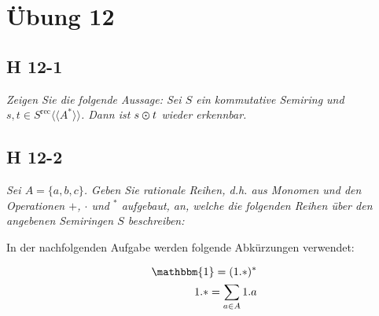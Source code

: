 \documentclass{scrartcl}
\begin{document}
\section{Übung 12}

\subsection{H 12-1}

\textsl{Zeigen Sie die folgende Aussage: Sei $S$ ein kommutative Semiring und $s, t \in S^{\text{rec}}\langle\langle A^* \rangle\rangle$. Dann ist $s \varodot t$ wieder erkennbar.}

\subsection{H 12-2}

\textsl{Sei $A = \{a, b, c\}$. Geben Sie rationale Reihen, d.h. aus Monomen und den Operationen $+$, $\cdot$ und ${}^*$ aufgebaut, an, welche die folgenden Reihen über den angebenen Semiringen $S$ beschreiben:}

In der nachfolgenden Aufgabe werden folgende Abkürzungen verwendet:

\begin{align*}
  \mathbbm{1} = (1.*)^*\\
  1.* = \sum\limits_{a \in A} 1.a\\
\end{align*}
\end{document}
